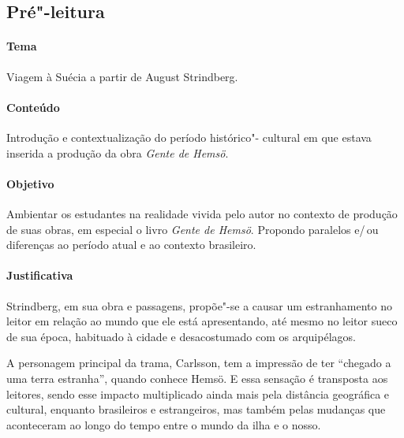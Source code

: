 \documentclass[12pt]{extarticle}
\begin{document}

\subsection{Pré"-leitura}

\paragraph{Tema} Viagem à Suécia a partir de August Strindberg.

\paragraph{Conteúdo} Introdução e contextualização do período histórico"-
cultural em que estava inserida a produção da obra \emph{Gente de Hemsö}.

\paragraph{Objetivo} Ambientar os estudantes na realidade vivida pelo 
autor no contexto de produção de suas obras, em especial o livro 
\emph{Gente de Hemsö}. Propondo paralelos e/\,ou diferenças ao período 
atual e ao contexto brasileiro. 

\paragraph{Justificativa} Strindberg, em sua obra e passagens, propõe"-se 
a causar um estranhamento no leitor em relação ao mundo que ele está
apresentando, até mesmo no leitor sueco de sua época, habituado à
cidade e desacostumado com os arquipélagos.

A personagem principal da trama, Carlsson, tem a impressão
de ter “chegado a uma terra estranha”, quando conhece Hemsö. E essa 
sensação é transposta aos leitores, sendo esse impacto multiplicado ainda 
mais pela distância geográfica e cultural, enquanto brasileiros e 
estrangeiros, mas também pelas mudanças que aconteceram ao longo do tempo 
entre o mundo da ilha e o nosso.
\end{document}
